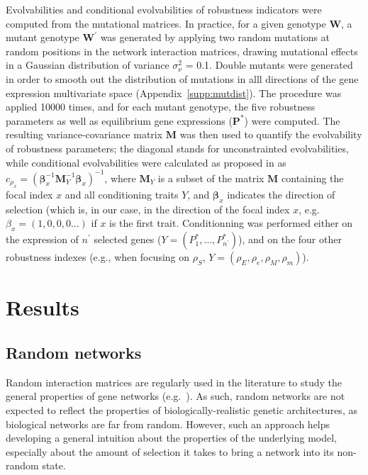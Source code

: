 \documentclass[10pt,a4paper]{article}
\newcommand{\stability}{{\rho_S}}
\newcommand{\earlyenv}{{\rho_E}}
\newcommand{\lateenv}{{\rho_e}}
\newcommand{\earlymut}{{\rho_M}}
\newcommand{\latemut}{{\rho_m}}
\newcommand{\SupMat}{Appendix~}
\begin{document}
Evolvabilities and conditional evolvabilities of robustness indicators were computed from the mutational matrices. In practice, for a given genotype $\bm W$, a mutant genotype $\bm W^\prime$ was generated by applying two random mutations at random positions in the network interaction matrices, drawing mutational effects in a Gaussian distribution of variance $\sigma_\nu^2$ = 0.1. Double mutants were generated in order to smooth out the distribution of mutations in alll directions of the gene expression multivariate space (\SupMat \ref{supp:mutdist}). The procedure was applied 10000 times, and for each mutant genotype, the five robustness parameters as well as equilibrium gene expressions ($\bm P^*$) were computed. The resulting variance-covariance matrix $\bm M$ was then used to quantify the evolvability of robustness parameters; the diagonal stands for unconstrainted evolvabilities, while conditional evolvabilities were calculated as proposed in \citet{HH08} as $c_{\rho_x} = (\bm \beta_x^{-1} \bm M_Y^{-1} \bm \beta_x)^{-1}$, where $\bm M_Y$ is a subset of the matrix $\bm M$ containing the focal index $x$ and all conditioning traits $Y$, and $\bm \beta_x$ indicates the direction of selection (which is, in our case, in the direction of the focal index $x$, e.g. $\beta_x = (1,0,0,0...)$ if $x$ is the first trait. Conditionning was performed either on the expression of $n^\prime$ selected genes ($Y = (P_1^*, \dots, P_{n^\prime}^*)$), and on the four other robustness indexes (e.g., when focusing on $\stability$, $Y = (\earlyenv, \lateenv, \earlymut, \latemut)$). 

\section{Results}

\subsection{Random networks}

Random interaction matrices are regularly used in the literature to study the general properties of gene networks (e.g.\ \cite{CTH11,PBF12}). As such, random networks are not expected to reflect the properties of biologically-realistic genetic architectures, as biological networks are far from random. However, such an approach helps developing a general intuition about the properties of the underlying model, especially about the amount of selection it takes to bring a network into its non-random state. 
\end{document}
